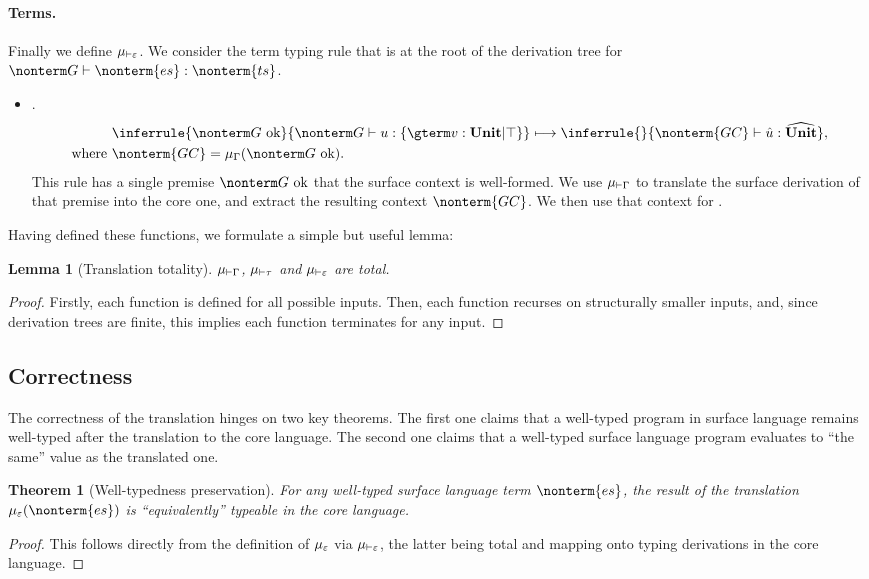 \documentclass[a4paper]{article}
\newtheorem{theorem}{Theorem}
\newtheorem{lemma}{Lemma}
\newcommand{\unit}{u}
\newcommand{\Unit}{\textbf{Unit}}
\newcommand{\unitc}{\hat{u}}
\newcommand{\Unitc}{\widehat{\textbf{Unit}}}
\begin{document}
\paragraph{Terms.}
Finally we define $\mu_{\vdash\varepsilon}$.
We consider the term typing rule that is at the root of the derivation tree for $\nonterm G \vdash \nonterm{es} : \nonterm{ts}$.

\begin{itemize}
  \item {}.
    \begin{align*}
      & \inferrule{\nonterm G \text{ ok}}{\nonterm G \vdash \unit : \{ \gterm v : \Unit | \top \}}
          \longmapsto
        \inferrule{ }{\nonterm{GC} \vdash \unitc : \Unitc}, \\
      \text{where}~&\nonterm{GC} = \tranctx(\nonterm G \text{ ok}).
    \end{align*}
    This rule has a single premise $\nonterm G \text{ ok}$ that the surface context is well-formed.
    We use $\mu_{\vdash\Gamma}$ to translate the surface derivation of that premise into the core one,
    and extract the resulting context $\nonterm{GC}$.
    We then use that context for .
\end{itemize}

Having defined these functions, we formulate a simple but useful lemma:
\begin{lemma}[Translation totality]
  $\mu_{\vdash\Gamma}$, $\mu_{\vdash\tau}$ and $\mu_{\vdash\varepsilon}$ are total.
\end{lemma}
\begin{proof}
  Firstly, each function is defined for all possible inputs.
  Then, each function recurses on structurally smaller inputs,
  and, since derivation trees are finite,
  this implies each function terminates for any input.
\end{proof}

\subsection{Correctness}

The correctness of the translation hinges on two key theorems.
The first one claims that a well-typed program in surface language remains well-typed after the translation to the core language.
The second one claims that a well-typed surface language program evaluates to ``the same'' value as the translated one.

\begin{theorem}[Well-typedness preservation]
  For any well-typed surface language term $\nonterm{es}$,
  the result of the translation $\tranterm(\nonterm{es})$ is ``equivalently'' typeable in the core language.
\end{theorem}
\begin{proof}
  This follows directly from the definition of $\mu_\varepsilon$ via $\mu_{\vdash\varepsilon}$,
  the latter being total and mapping onto typing derivations in the core language.
\end{proof}
\end{document}
